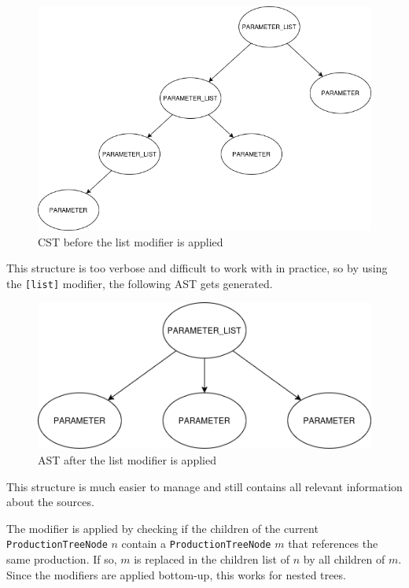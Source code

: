 \begin{figure}[H]
    \centering
    \includegraphics[scale=0.4]{"fig/list_modifier_cst.png"}
    \caption{CST before the list modifier is applied}
\end{figure}

This structure is too verbose and difficult to work with in practice, so by using the \verb|[list]| modifier, the following AST gets generated.

\begin{figure}[H]
    \centering
    \includegraphics[scale=0.4]{"fig/list_modifier_ast.png"}
    \caption{AST after the list modifier is applied}
\end{figure}

This structure is much easier to manage and still contains all relevant information about the sources.

The modifier is applied by checking if the children of the current \verb|ProductionTreeNode| $n$ contain a \verb|ProductionTreeNode| $m$ that references the same production. If so, $m$ is replaced in the children list of $n$ by all children of $m$.
Since the modifiers are applied bottom-up, this works for nested trees.

